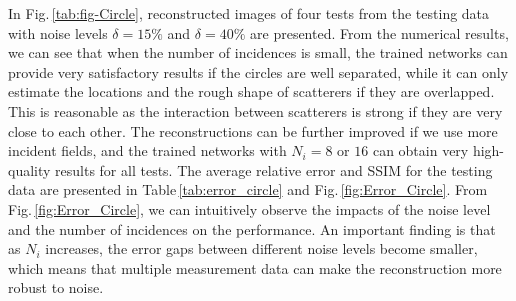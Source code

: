\documentclass{article}
\begin{document}
	In Fig.\,\ref{tab:fig-Circle}, reconstructed images of four tests from the testing data with noise levels $\delta=15\%$ and $\delta=40\%$ are presented. From the numerical results, we can see that when the number of incidences is small, the trained networks can provide very satisfactory results if the circles are well separated, while it can only estimate the locations and the rough shape of scatterers if they are overlapped. This is reasonable as the interaction between scatterers is strong if they are very close to each other. The reconstructions can be further improved if we use more incident fields, and the trained networks with $N_{i}=8$ or $16$ can obtain very high-quality results for all tests. The average relative error and SSIM for the testing data are presented in Table\,\ref{tab:error_circle} and Fig.\,\ref{fig:Error_Circle}. From Fig.\,\ref{fig:Error_Circle}, we can intuitively observe the impacts of the noise level and the number of incidences on the performance. An important finding is that as $N_{i}$ increases, the error gaps between different noise levels become smaller, which means that multiple measurement data can make the reconstruction more robust to noise.
\end{document}
